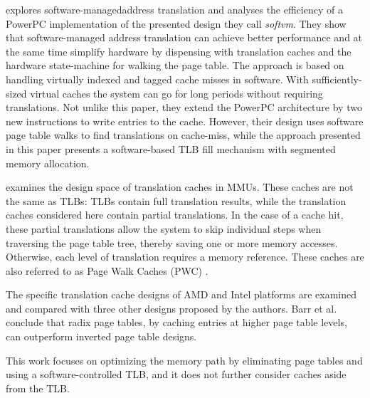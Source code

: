 \textbf{\cite{jacobSoftwaremanagedAddressTranslation1997}}explores software-managedaddress translation and analyses the efficiency of a PowerPC implementation
of the presented design they call \textit{softvm}. They show that
software-managed address translation can achieve better performance and
at the same time simplify hardware by dispensing with translation caches and
the hardware state-machine for walking the page table.
The approach is based on handling virtually indexed and tagged cache misses in
software.
With sufficiently-sized virtual caches the system can go for long periods
without requiring translations.
Not unlike this paper, they extend the PowerPC architecture by two new instructions
to write entries to the cache. However, their design uses software page table
walks to find translations on cache-miss, while the approach presented in this
paper presents a software-based TLB fill mechanism with segmented
memory allocation.


\textbf{\cite{barrTranslationCachingSkip}} examines the design space of translation caches in MMUs. These caches are not the same as TLBs: TLBs contain full translation results, while the translation caches considered here contain partial translations. In the case of a cache hit, these partial translations allow the system to skip individual steps when traversing the page table tree, thereby saving one or more memory accesses. Otherwise, each level of translation requires a memory reference. These caches are also referred to as Page Walk Caches (PWC) \cite{yaniv2016hash}.

The specific translation cache designs of AMD and Intel platforms are examined and compared with three other designs proposed by the authors. Barr et al. conclude that radix page tables, by caching entries at higher page table levels, can outperform inverted page table designs.

This work focuses on optimizing the memory path by eliminating page tables and using a software-controlled TLB, and it does not further consider caches aside from the TLB.




